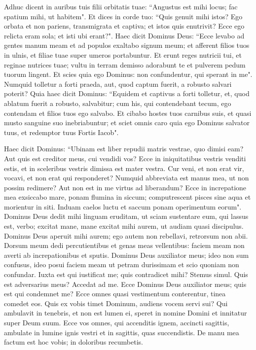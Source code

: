 \begin{biblechapter}
\verse Adhuc dicent in auribus tuis filii orbitatis tuae: “Angustus est mihi locus; fac spatium mihi, ut habitem". 
\verse Et dices in corde tuo: “Quis genuit mihi istos? Ego orbata et non pariens, transmigrata et captiva; et istos quis enutrivit? Ecce ego relicta eram sola; et isti ubi erant?". 
\verse Haec dicit Dominus Deus: “Ecce levabo ad gentes manum meam et ad populos exaltabo signum meum; et afferent filios tuos in ulnis, et filiae tuae super umeros portabuntur. 
\verse Et erunt reges nutricii tui, et reginae nutrices tuae; vultu in terram demisso adorabunt te et pulverem pedum tuorum lingent. Et scies quia ego Dominus: non confundentur, qui sperant in me". 
\verse Numquid tolletur a forti praeda, aut, quod captum fuerit, a robusto salvari poterit? 
\verse Quia haec dicit Dominus: “Equidem et captivus a forti tolletur, et, quod ablatum fuerit a robusto, salvabitur; cum his, qui contendebant tecum, ego contendam et filios tuos ego salvabo. 
\verse Et cibabo hostes tuos carnibus suis, et quasi musto sanguine suo inebriabuntur; et sciet omnis caro quia ego Dominus salvator tuus, et redemptor tuus Fortis Iacob". 
\end{biblechapter}

\begin{biblechapter}  
\verse Haec dicit Dominus: “Ubinam est liber repudii matris vestrae, quo dimisi eam? Aut quis est creditor meus, cui vendidi vos? Ecce in iniquitatibus vestris venditi estis, et in sceleribus vestris dimissa est mater vestra. 
\verse Cur veni, et non erat vir, vocavi, et non erat qui responderet? Numquid abbreviata est manus mea, ut non possim redimere? Aut non est in me virtus ad liberandum? Ecce in increpatione mea exsiccabo mare, ponam flumina in siccum; computrescent pisces sine aqua et morientur in siti. 
\verse Induam caelos luctu et saccum ponam operimentum eorum". 
\verse Dominus Deus dedit mihi linguam eruditam, ut sciam sustentare eum, qui lassus est, verbo; excitat mane, mane excitat mihi aurem, ut audiam quasi discipulus. 
\verse Dominus Deus aperuit mihi aurem; ego autem non rebellavi, retrorsum non abii. 
\verse Dorsum meum dedi percutientibus et genas meas vellentibus: faciem meam non averti ab increpationibus et sputis. 
\verse Dominus Deus auxiliator meus; ideo non sum confusus, ideo posui faciem meam ut petram durissimam et scio quoniam non confundar. 
\verse Iuxta est qui iustificat me; quis contradicet mihi? Stemus simul. Quis est adversarius meus? Accedat ad me. 
\verse Ecce Dominus Deus auxiliator meus; quis est qui condemnet me? Ecce omnes quasi vestimentum conterentur, tinea comedet eos. 
\verse Quis ex vobis timet Dominum, audiens vocem servi sui? Qui ambulavit in tenebris, et non est lumen ei, speret in nomine Domini et innitatur super Deum suum. 
\verse Ecce vos omnes, qui accenditis ignem, accincti sagittis, ambulate in lumine ignis vestri et in sagittis, quas succendistis. De manu mea factum est hoc vobis; in doloribus recumbetis. 
\end{biblechapter}

